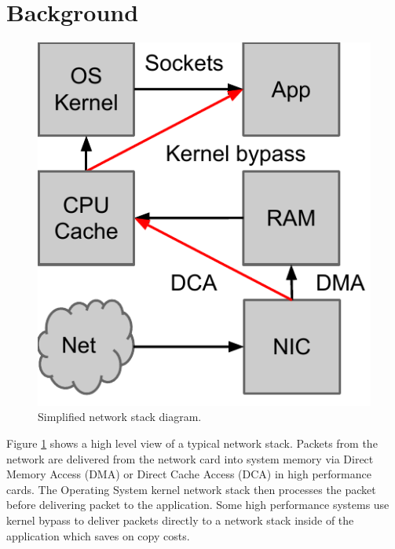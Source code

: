 
\section{Background}
\label{s:background}

\begin{figure}
 \centering
 \includegraphics[width=0.5\columnwidth]{figures/net_simple.pdf}
 \caption{Simplified network stack diagram.}
 \label{f:net_stack}
\end{figure}

Figure \ref{f:net_stack} shows a high level view of a typical network stack. 
Packets from the network are delivered from the network card into system memory via Direct Memory Access (DMA) or Direct Cache Access (DCA) in high performance cards. 
The Operating System kernel network stack then processes the packet before delivering packet to the application. 
Some high performance systems use kernel bypass to deliver packets directly to a network stack inside of the application which saves on copy costs. 